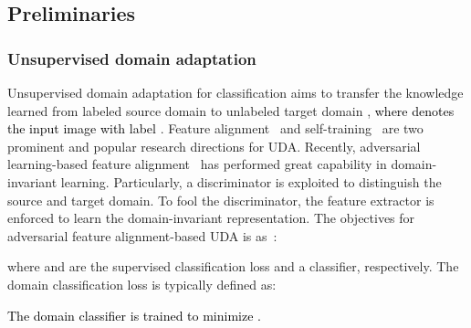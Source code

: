 \documentclass[journal]{IEEEtran}
\newcommand{\tcb}{\textcolor{black}}
\newcommand{\tco}{\textcolor{black}}
\begin{document}
\subsection{Preliminaries}
\subsubsection{Unsupervised domain adaptation}
Unsupervised domain adaptation for classification aims to transfer the knowledge learned from labeled source domain  to unlabeled target domain , \tco{where  denotes the input image with label }. Feature  alignment~\cite{long2018conditionalCDAN,ganin2016domain_dann,borgwardt2006integratingMMD,chen2019progressive} and self-training~\cite{xu2021cdtransCDTrans,gu2020spherical,mei2020instance,liu2021cycle} are two prominent and popular research directions for UDA. Recently, adversarial learning-based feature alignment~\cite{ganin2016domain_dann} has performed great capability in domain-invariant learning. Particularly, a discriminator  is exploited to distinguish the source and target domain. To fool the discriminator, the feature extractor  is enforced to learn the domain-invariant representation. The objectives for adversarial feature alignment-based UDA is as~\cite{ganin2016domain_dann}:

where  and  are the supervised classification loss and a classifier, respectively. The domain classification loss  is typically defined as:


\tcb{The domain classifier is trained to minimize .}
\end{document}
